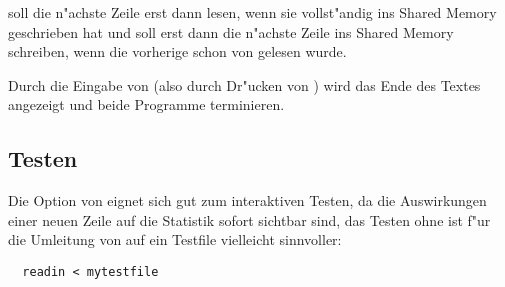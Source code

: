  soll die n"achste Zeile erst dann lesen, wenn 
sie vollst"andig ins Shared Memory geschrieben hat und  soll
erst dann die n"achste Zeile ins Shared Memory schreiben,
wenn die vorherige schon von  gelesen wurde.

Durch die Eingabe von  (also durch Dr"ucken von )
wird das Ende des Textes angezeigt und beide Programme terminieren.



\subsection*{Testen}

Die Option  von  eignet sich gut zum interaktiven
Testen, da die Auswirkungen einer neuen Zeile auf die Statistik sofort
sichtbar sind, das Testen ohne  ist f"ur die Umleitung von
 auf ein Testfile vielleicht sinnvoller:
\begin{verbatim}
  readin < mytestfile
\end{verbatim}

\osueguidelinesthree


